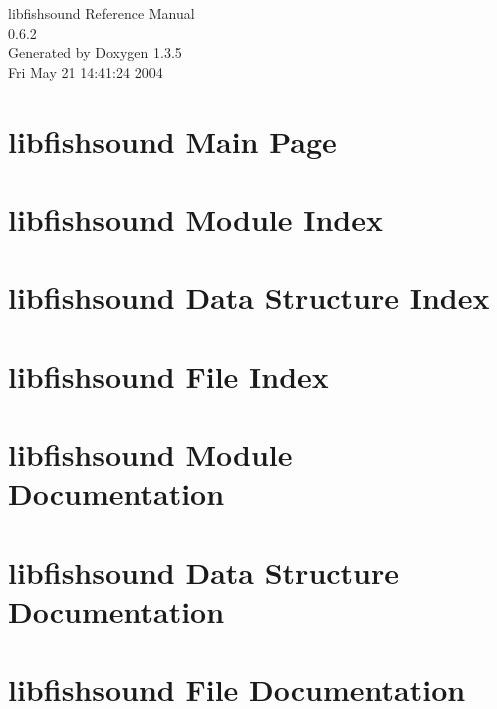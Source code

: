 \documentclass[a4paper]{book}
\begin{document}
\begin{titlepage}
\vspace*{7cm}
\begin{center}
{\Large libfishsound Reference Manual\\[1ex]\large 0.6.2 }\\
\vspace*{1cm}
{\large Generated by Doxygen 1.3.5}\\
\vspace*{0.5cm}
{\small Fri May 21 14:41:24 2004}\\
\end{center}
\end{titlepage}
\clearemptydoublepage
{}
\tableofcontents
\clearemptydoublepage
{}
\chapter{libfishsound Main Page}
\label{index}
\chapter{libfishsound Module Index}

\chapter{libfishsound Data Structure Index}

\chapter{libfishsound File Index}

\chapter{libfishsound Module Documentation}







\chapter{libfishsound Data Structure Documentation}



\chapter{libfishsound File Documentation}



\printindex
\end{document}
